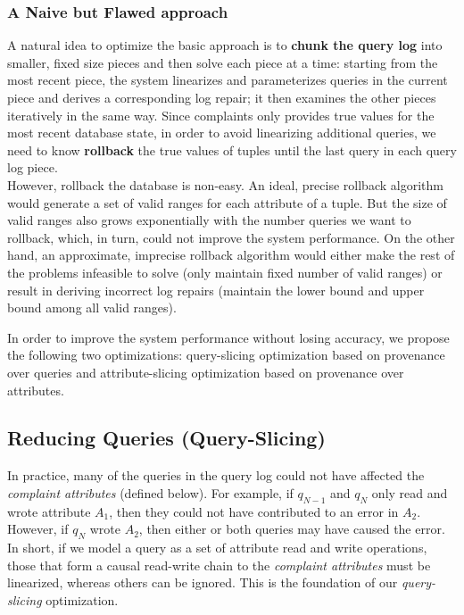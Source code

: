   \subsubsection{A Naive but Flawed approach}
  A natural idea to optimize the basic approach is 
  to \textbf{chunk the query log} into
  smaller, fixed size pieces and then solve each piece at a time: starting
  from the most recent piece, the system linearizes and parameterizes queries 
  in the current piece and derives a corresponding log repair; 
  it then examines the other pieces iteratively
  in the same way. Since complaints only provides
  true values for the most recent database state, in order to avoid 
  linearizing additional queries, 
  we need to know \textbf{rollback} the true values of tuples 
  until the last query in each query log piece. \\
  However, rollback the database is non-easy. An ideal, precise rollback
  algorithm would generate a set of valid ranges for each attribute of a tuple. 
  But the size of valid ranges also grows exponentially with the number queries
  we want to rollback, which, in turn, could not improve the system performance. 
  On the other hand, an approximate, imprecise 
  rollback algorithm would either make the rest of the problems
  infeasible to solve (only maintain fixed number of valid ranges) 
  or result in deriving 
  incorrect log repairs (maintain the lower 
  bound and upper bound among all valid ranges).
    

  In order to improve the system performance without losing accuracy, we propose
  the following two optimizations: query-slicing optimization 
  based on provenance over queries and
  attribute-slicing optimization based on provenance over 
  attributes. 
\fi





\subsection{Reducing Queries (Query-Slicing)}
\label{sec:opt:query}


In practice, many of the queries in the query log could not have affected the \emph{complaint attributes} (defined below). For example, if $q_{N-1}$ and $q_{N}$ 
only read and wrote attribute $A_1$, then they could not have contributed to an error in $A_2$.  
However, if $q_{N}$  wrote $A_2$, then either or both queries may have caused the error. 
In short, if we model a query as a set of attribute read and write operations, those that form a 
causal read-write chain to the \emph{complaint attributes} must be linearized, whereas others can be ignored.  This is the foundation of our \emph{query-slicing} optimization.

